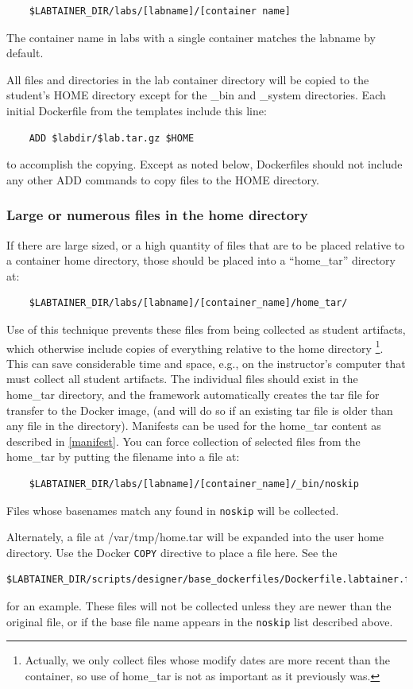 \documentclass[12pt]{article}
\begin{document}
\begin{verbatim}
    $LABTAINER_DIR/labs/[labname]/[container name]
\end{verbatim}
The container name in labs with a single container matches the labname by default.

All files and directories in the lab container directory will be copied to the student's HOME
directory except for the \_bin and \_system directories.
Each initial Dockerfile from the templates include this line:
\begin{verbatim}
    ADD $labdir/$lab.tar.gz $HOME
\end{verbatim}
to accomplish the copying. Except as noted below, Dockerfiles should not include any other ADD commands
to copy files to the HOME directory.
\subsubsection{Large or numerous files in the home directory} \label{large files}
If there are large sized, or a high quantity of files that are to be placed relative to a 
container home directory, those should be placed into a ``home\_tar'' directory at:
\begin{verbatim}
    $LABTAINER_DIR/labs/[labname]/[container_name]/home_tar/
\end{verbatim}
\noindent Use of this technique prevents these files from being collected as student artifacts, which
otherwise include copies of everything relative to the home directory \footnote{Actually, we only collect
files whose modify dates are more recent than the container, so use of home\_tar is not as
important as it previously was.}.  This
can save considerable time and space, e.g., on the instructor's computer that must collect
all student artifacts.
The individual files should exist in the home\_tar directory, and the framework automatically
creates the tar file for transfer to the Docker image, (and will do so if an existing tar file
is older than any file in the directory).  Manifests can be used for the home\_tar content
as described in \ref{manifest}.  You can force collection of selected files from the home\_tar
by putting the filename into a file at:
\begin{verbatim}
    $LABTAINER_DIR/labs/[labname]/[container_name]/_bin/noskip
\end{verbatim}
\noindent  Files whose basenames match any found in {\tt noskip} will be collected.

Alternately, a file at /var/tmp/home.tar will be expanded into the user home directory.
Use the Docker {\tt COPY} directive to place a file here.  See the 
\begin{verbatim}
$LABTAINER_DIR/scripts/designer/base_dockerfiles/Dockerfile.labtainer.firefox
\end{verbatim}
for an example.  These files will not be collected unless they are newer than the original file,
or if the base file name appears in the {\tt noskip} list described above.
\end{document}
